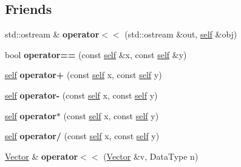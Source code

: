 \subsection*{Friends}
\begin{DoxyCompactItemize}
\item 
\mbox{\label{classez_1_1maths_1_1Vector_aa1d826e7fbedbc2b2358e08bc03fc894}} 
std\+::ostream \& {\bfseries operator$<$$<$} (std\+::ostream \&out, \hyperlink{classez_1_1maths_1_1Vector}{self} \&obj)
\item 
\mbox{\label{classez_1_1maths_1_1Vector_a89b571e0607100045577d5023a77342b}} 
bool {\bfseries operator==} (const \hyperlink{classez_1_1maths_1_1Vector}{self} \&x, const \hyperlink{classez_1_1maths_1_1Vector}{self} \&y)
\item 
\mbox{\label{classez_1_1maths_1_1Vector_ac219ecb06730e7707b9bb78b5da63c3b}} 
\hyperlink{classez_1_1maths_1_1Vector}{self} {\bfseries operator+} (const \hyperlink{classez_1_1maths_1_1Vector}{self} x, const \hyperlink{classez_1_1maths_1_1Vector}{self} y)
\item 
\mbox{\label{classez_1_1maths_1_1Vector_a6750cba02a1d652b1bd892bfba555e50}} 
\hyperlink{classez_1_1maths_1_1Vector}{self} {\bfseries operator-\/} (const \hyperlink{classez_1_1maths_1_1Vector}{self} x, const \hyperlink{classez_1_1maths_1_1Vector}{self} y)
\item 
\mbox{\label{classez_1_1maths_1_1Vector_a4f9af882c7a074ed8e1f8da41bd31dc9}} 
\hyperlink{classez_1_1maths_1_1Vector}{self} {\bfseries operator$\ast$} (const \hyperlink{classez_1_1maths_1_1Vector}{self} x, const \hyperlink{classez_1_1maths_1_1Vector}{self} y)
\item 
\mbox{\label{classez_1_1maths_1_1Vector_aa69c5e8b6898bb99a6f4d6e8962560c8}} 
\hyperlink{classez_1_1maths_1_1Vector}{self} {\bfseries operator/} (const \hyperlink{classez_1_1maths_1_1Vector}{self} x, const \hyperlink{classez_1_1maths_1_1Vector}{self} y)
\item 
\mbox{\label{classez_1_1maths_1_1Vector_ace48be602ed1ae3d276b4f458b9302c6}} 
\hyperlink{classez_1_1maths_1_1Vector}{Vector} \& {\bfseries operator$<$$<$} (\hyperlink{classez_1_1maths_1_1Vector}{Vector} \&v, Data\+Type n)
\end{DoxyCompactItemize}


